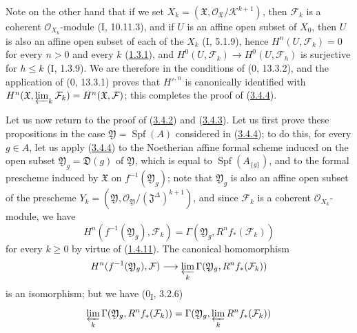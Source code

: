 Note on the other hand that if we set
$X_k=(\mathfrak X,\mathcal O_{\mathfrak X}/\mathcal K^{k+1})$, then
$\mathcal F_k$ is a coherent $\mathcal O_{X_k}$-module (I, 10.11.3), and if
$U$ is an affine open subset of $X_0$, then $U$ is also an affine open subset of
each of the $X_k$ (I, 5.1.9), hence $H^n(U,\mathcal F_k)=0$ for every $n>0$ and
every $k$ (\hyperref[III.1.3.1]{1.3.1}), and
$H^0(U,\mathcal F_k)\to H^0(U,\mathcal F_h)$ is surjective for $h\leq k$
(I, 1.3.9). We are therefore in the conditions of (0, 13.3.2), and the application
of (0, 13.3.1) proves that $H'^{,n}$ is canonically identified with
$H^n(\mathfrak X,\varprojlim_k\mathcal F_k)=H^n(\mathfrak X,\mathcal F)$;
this completes the proof of (\hyperref[III.3.4.4]{3.4.4}).

\begin{env}[3.4.5]
\label{III.3.4.5}
Let us now return to the proof of (\hyperref[III.3.4.2]{3.4.2})
and (\hyperref[III.3.4.3]{3.4.3}). Let us first prove these propositions in
the case $\mathfrak Y=\operatorname{Spf}(A)$ considered in
(\hyperref[III.3.4.4]{3.4.4}); to do this, for every $g\in A$, let us apply
(\hyperref[III.3.4.4]{3.4.4}) to the Noetherian affine formal scheme induced
on the open subset $\mathfrak Y_g=\mathfrak D(g)$ of $\mathfrak Y$, which is equal to
$\operatorname{Spf}(A_{\{g\}})$, and to the formal prescheme induced by
$\mathfrak X$ on $f^{-1}(\mathfrak Y_g)$; note that $\mathfrak Y_g$ is
also an affine open subset of the prescheme
$Y_k=(\mathfrak Y,\mathcal O_{\mathfrak Y}/(\mathfrak J^\Delta)^{k+1})$,
and since $\mathcal F_k$ is a coherent $\mathcal O_{X_k}$-module, we have
\[
H^n(f^{-1}(\mathfrak Y_g),\mathcal F_k)
=\Gamma(\mathfrak Y_g,R^nf_*(\mathcal F_k))
\]
for every $k\geq0$ by virtue of
(\hyperref[III.1.4.11]{1.4.11}). The canonical homomorphism
\[
H^n(f^{-1}(\mathfrak Y_g),\mathcal F)
\longrightarrow\varprojlim_k\Gamma(\mathfrak Y_g,R^nf_*(\mathcal F_k))
\]
is an isomorphism; but we have (0\textsubscript{I}, 3.2.6)
\[
\varprojlim_k\Gamma(\mathfrak Y_g,R^nf_*(\mathcal F_k))
=\Gamma(\mathfrak Y_g,\varprojlim_kR^nf_*(\mathcal F_k))
\]


\end{env}
